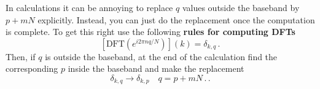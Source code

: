 In calculations it can be annoying to replace $q$ values outside the baseband by $p+mN$ explicitly.
Instead, you can just do the replacement once the computation is complete.
To get this right use the following \textbf{rules for computing DFTs}
\begin{equation}
  \left[ \textrm{DFT}\left( e^{i2\pi nq/N} \right)\right](k) = \delta_{k,q} \, .
\end{equation}
Then, if $q$ is outside the baseband, at the end of the calculation find the corresponding $p$ inside the baseband and make the replacement
\begin{equation}
  \delta_{k,q} \rightarrow \delta_{k,p} \quad q=p+mN \, . \label{eq:aliasReplacement}
  \, .
\end{equation}
